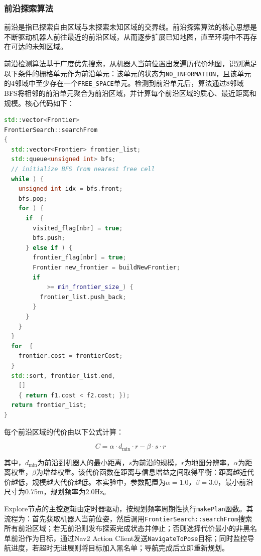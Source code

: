 \documentclass[a4paper,12pt]{article}
\begin{document}
\subsubsection{前沿探索算法}

前沿是指已探索自由区域与未探索未知区域的交界线。前沿探索算法的核心思想是不断驱动机器人前往最近的前沿区域，从而逐步扩展已知地图，直至环境中不再存在可达的未知区域。

前沿检测算法基于广度优先搜索，从机器人当前位置出发遍历代价地图，识别满足以下条件的栅格单元作为前沿单元：该单元的状态为\texttt{NO\_INFORMATION}，且该单元的4邻域中至少存在一个\texttt{FREE\_SPACE}单元。检测到前沿单元后，算法通过8邻域BFS将相邻的前沿单元聚合为前沿区域，并计算每个前沿区域的质心、最近距离和规模。核心代码如下：

\begin{lstlisting}[language=C++,title={前沿检测核心代码}]
std::vector<Frontier>
FrontierSearch::searchFrom
{
  std::vector<Frontier> frontier_list;
  std::queue<unsigned int> bfs;
  // initialize BFS from nearest free cell
  while ) {
    unsigned int idx = bfs.front;
    bfs.pop;
    for ) {
      if  {
        visited_flag[nbr] = true;
        bfs.push;
      } else if ) {
        frontier_flag[nbr] = true;
        Frontier new_frontier = buildNewFrontier;
        if 
            >= min_frontier_size_) {
          frontier_list.push_back;
        }
      }
    }
  }
  for  {
    frontier.cost = frontierCost;
  }
  std::sort, frontier_list.end,
    []
    { return f1.cost < f2.cost; });
  return frontier_list;
}
\end{lstlisting}

每个前沿区域的代价由以下公式计算：

\begin{equation}
  C = \alpha \cdot d_{\min} \cdot r - \beta \cdot s \cdot r
  \label{eq:frontier_cost}
\end{equation}

其中，$d_{\min}$为前沿到机器人的最小距离，$s$为前沿的规模，$r$为地图分辨率，$\alpha$为距离权重，$\beta$为增益权重。该代价函数在距离与信息增益之间取得平衡：距离越近代价越低，规模越大代价越低。本实验中，参数配置为$\alpha = 1.0$，$\beta = 3.0$，最小前沿尺寸为0.75m，规划频率为2.0Hz。

Explore节点的主控逻辑由定时器驱动，按规划频率周期性执行\texttt{makePlan}函数。其流程为：首先获取机器人当前位姿，然后调用\texttt{FrontierSearch::searchFrom}搜索所有前沿区域；若无前沿则发布探索完成状态并停止；否则选择代价最小的非黑名单前沿作为目标，通过Nav2 Action Client发送\texttt{NavigateToPose}目标；同时监控导航进度，若超时无进展则将目标加入黑名单；导航完成后立即重新规划。
\end{document}
